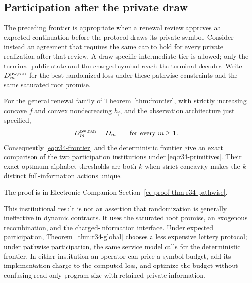 \subsection{Participation after the private draw}
The preceding frontier is appropriate when a renewal review approves an expected continuation before the protocol draws its private symbol. Consider instead an agreement that requires the same cap to hold for every private realization after that review. A draw-specific intermediate tier is allowed; only the terminal public state and the charged symbol reach the terminal decoder. Write $D_m^{\rm pw,ran}$ for the best randomized loss under these pathwise constraints and the same saturated root promise.

\begin{theorem}\label{thm:r34-pathwise}
For the general renewal family of Theorem~\ref{thm:frontier}, with strictly increasing concave $f$ and convex nondecreasing $h_j$, and the observation architecture just specified,
\begin{equation}\label{eq:r34-pathwise}
 D_m^{\rm pw,ran}=D_m\qquad\text{for every }m\geq1.
\end{equation}
Consequently \eqref{eq:r34-frontier} and the deterministic frontier give an exact comparison of the two participation institutions under \eqref{eq:r34-primitives}. Their exact-optimum alphabet thresholds are both $k$ when strict concavity makes the $k$ distinct full-information actions unique.
\end{theorem}
\noindent The proof is in Electronic Companion Section~\ref{ec-proof-thm-r34-pathwise}.


This institutional result is not an assertion that randomization is generally ineffective in dynamic contracts. It uses the saturated root promise, an exogenous recombination, and the charged-information interface. Under expected participation, Theorem~\ref{thm:r34-global} chooses a less expensive lottery protocol; under pathwise participation, the same service model calls for the deterministic frontier. In either institution an operator can price a symbol budget, add its implementation charge to the computed loss, and optimize the budget without confusing read-only program size with retained private information.

